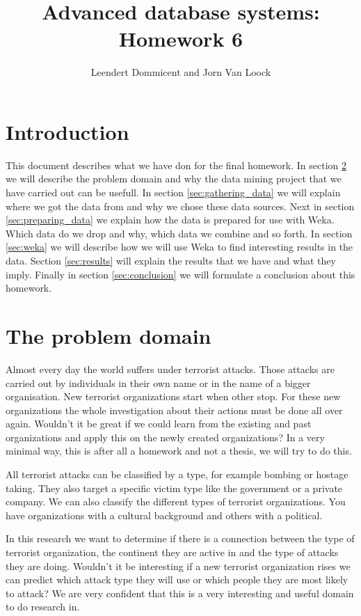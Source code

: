 \documentclass[a4]{article}
\title{Advanced database systems: Homework 6}
\author{Leendert Dommicent and Jorn Van Loock}
\date{}
\begin{document}
\maketitle
\setlength{\parindent}{0px}
\setlength{\parskip}{8px}
\section{Introduction}
This document describes what we have don for the final homework. In section \ref{sec:problem} we will describe the problem domain and why the data mining project that we have carried out can be usefull. In section \ref{sec:gathering_data} we will explain where we got the data from and why we chose these data sources. Next in section \ref{sec:preparing_data} we explain how the data is prepared for use with Weka. Which data do we drop and why, which data we combine and so forth. In section \ref{sec:weka} we will describe how we will use Weka to find interesting results in the data. Section \ref{sec:results} will explain the results that we have and what they imply. Finally in section \ref{sec:conclusion} we will formulate a conclusion about this homework.
\section{The problem domain}
\label{sec:problem}
Almost every day the world suffers under terrorist attacks. Those attacks are carried out by individuals in their own name or in the name of a bigger organisation. New terrorist organizations start when other stop. For these new organizations the whole investigation about their actions must be done all over again. Wouldn't it be great if we could learn from the existing and past organizations and apply this on the newly created organizations? In a very minimal way, this is after all a homework and not a thesis, we will try to do this.\par
All terrorist attacks can be classified by a type, for example bombing or hostage taking. They also target a specific victim type like the government or a private company. We can also classify the different types of terrorist organizations. You have organizations with a cultural background and others with a political.\par
In this research we want to determine if there is a connection between the type of terrorist organization, the continent they are active in and the type of attacks they are doing. Wouldn't it be interesting if a new terrorist organization rises we can predict which attack type they will use or which people they are most likely to attack? We are very confident that this is a very interesting and useful domain to do research in.
\end{document}
